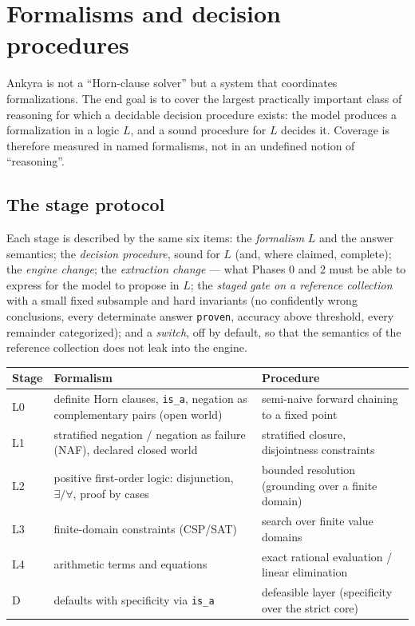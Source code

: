\documentclass[11pt,a4paper]{article}
\begin{document}
\section{Formalisms and decision procedures}
\label{sec:formalisms}

Ankyra is not a ``Horn-clause solver'' but a system that coordinates formalizations. The end
goal is to cover the largest practically important class of reasoning for which a decidable
decision procedure exists: the model produces a formalization in a logic $L$, and a sound
procedure for $L$ decides it. Coverage is therefore measured in named formalisms, not in an
undefined notion of ``reasoning''.

\subsection{The stage protocol}

Each stage is described by the same six items: the \emph{formalism} $L$ and the answer
semantics; the \emph{decision procedure}, sound for $L$ (and, where claimed, complete); the
\emph{engine change}; the \emph{extraction change} --- what Phases 0 and 2 must be able to
express for the model to propose in $L$; the \emph{staged gate on a reference collection}
with a small fixed subsample and hard invariants (no confidently wrong conclusions, every
determinate answer \texttt{proven}, accuracy above threshold, every remainder categorized);
and a \emph{switch}, off by default, so that the semantics of the reference collection does
not leak into the engine.

\begin{center}
\begin{tabular}{p{0.8cm}p{5.6cm}p{5.4cm}}
\toprule
\textbf{Stage} & \textbf{Formalism} & \textbf{Procedure} \\
\midrule
L0 & definite Horn clauses, \texttt{is\_a}, negation as complementary pairs (open world) & semi-naive forward chaining to a fixed point \\
L1 & stratified negation / negation as failure (NAF), declared closed world & stratified closure, disjointness constraints \\
L2 & positive first-order logic: disjunction, $\exists/\forall$, proof by cases & bounded resolution (grounding over a finite domain) \\
L3 & finite-domain constraints (CSP/SAT) & search over finite value domains \\
L4 & arithmetic terms and equations & exact rational evaluation / linear elimination \\
D  & defaults with specificity via \texttt{is\_a} & defeasible layer (specificity over the strict core) \\
\bottomrule
\end{tabular}
\end{center}
\end{document}
